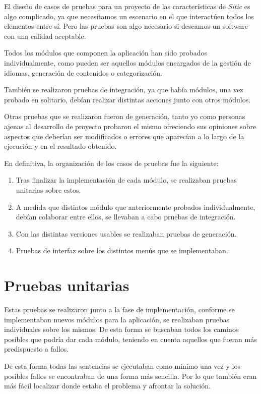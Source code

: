 El diseño de casos de pruebas para un proyecto de las características de \emph{Sitic}
es algo complicado, ya que necesitamos un escenario en el que interactúen todos los
elementos entre sí. Pero las pruebas son algo necesario si deseamos un software con una
calidad aceptable.

Todos los módulos que componen la aplicación han sido probados individualmente, como pueden
ser aquellos módulos encargados de la gestión de idiomas, generación de contenidos o categorización.

También se realizaron pruebas de integración, ya que había módulos, una vez probado en solitario,
debían realizar distintas acciones junto con otros módulos.

Otras pruebas que se realizaron fueron de generación, tanto yo como
personas ajenas al desarrollo de proyecto probaron el
mismo ofreciendo sus opiniones sobre aspectos que deberían ser modificados o
errores que aparecían a lo largo de la ejecución y en el resultado obtenido.

En definitiva, la organización de los casos de pruebas fue la siguiente:

\begin{enumerate}
    \item Tras finalizar la implementación de cada módulo, se realizaban pruebas unitarias sobre estos.
    \item A medida que distintos módulo que anteriormente probados individualmente, debían colaborar entre ellos, se
    llevaban a cabo pruebas de integración.
    \item Con las distintas versiones usables se realizaban pruebas de generación.
    \item Pruebas de interfaz sobre los distintos menús que se implementaban.
\end{enumerate}

\section{Pruebas unitarias}

Estas pruebas se realizaron junto a la fase de implementación, conforme se implementaban nuevos módulos para la aplicación,
se realizaban pruebas individuales sobre los mismos. De esta forma se buscaban todos los caminos posibles que podría dar cada
módulo, teniendo en cuenta aquellos que fueran más predispuesto a fallos.

De esta forma todas las sentencias se ejecutaban como mínimo una vez y los posibles fallos se encontraban de una forma más sencilla.
Por lo que también eran más fácil localizar donde estaba el problema y afrontar la solución.

